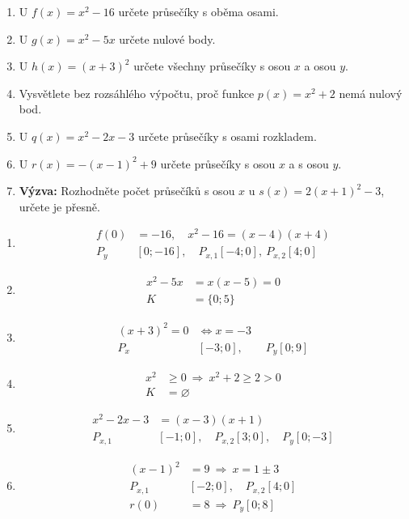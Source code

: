 \documentclass[11pt,a4paper]{article}
\begin{document}
\begin{zadaniReseniBox}[title={Domácí úkol}]
\begin{enumerate}[label=\alph*),itemsep=3pt]
\item U $f(x)=x^2-16$ určete průsečíky s oběma osami.
\item U $g(x)=x^2-5x$ určete nulové body.
\item U $h(x)=(x+3)^2$ určete všechny průsečíky s osou $x$ a osou $y$.
\item Vysvětlete bez rozsáhlého výpočtu, proč funkce $p(x)=x^2+2$ nemá nulový bod.
\item U $q(x)=x^2-2x-3$ určete průsečíky s osami rozkladem.
\item U $r(x)=-(x-1)^2+9$ určete průsečíky s osou $x$ a s osou $y$.
\item \textbf{Výzva:} Rozhodněte počet průsečíků s osou $x$ u $s(x)=2(x+1)^2-3$, určete je přesně.
\end{enumerate}
\tcblower
\begin{enumerate}[label=\alph*),itemsep=4pt]
\item
\[
\begin{aligned}
f(0)&=-16,\quad x^2-16=(x-4)(x+4) \\
P_y&[0;-16],\quad P_{x,1}[-4;0],\ P_{x,2}[4;0]
\end{aligned}
\]

\item
\[
\begin{aligned}
x^2-5x&=x(x-5)=0 \\
K&=\{0;5\}
\end{aligned}
\]

\item
\[
\begin{aligned}
(x+3)^2=0&\iff x=-3 \\
P_x&[-3;0],\qquad P_y[0;9]
\end{aligned}
\]

\item
\[
\begin{aligned}
x^2&\ge0\ \Rightarrow\ x^2+2\ge2>0 \\
K&=\varnothing
\end{aligned}
\]

\item
\[
\begin{aligned}
x^2-2x-3&=(x-3)(x+1) \\
P_{x,1}&[-1;0],\quad P_{x,2}[3;0],\quad P_y[0;-3]
\end{aligned}
\]

\item
\[
\begin{aligned}
(x-1)^2&=9\ \Rightarrow\ x=1\pm3 \\
P_{x,1}&[-2;0],\quad P_{x,2}[4;0] \\
r(0)&=8\ \Rightarrow\ P_y[0;8]
\end{aligned}
\]


\end{enumerate}
\end{zadaniReseniBox}
\end{document}
